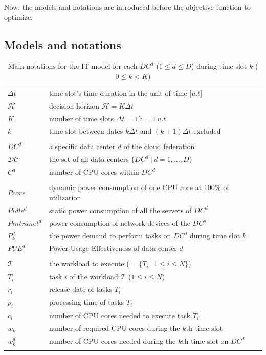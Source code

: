 Now, the models and notations are introduced before the objective function to optimize.

\subsection{Models and notations}
\label{sec:modelsnotations_ccgrid}

\begin{table}[!t]
\caption{Main notations for the IT model for each $DC^d$ ($1\leq d\leq D$) during time slot $k$ ($0\leq k< K$)\label{table:variablesIT}}
\begin{center}
\begin{tabular}{l p{6cm}}


$\Delta t$ & time slot's time duration in the unit of time [$u.t$] \\
$\mathcal{H}$ & decision horizon $\mathcal{H} = K\Delta t$ \\
$K$ & number of time slots $\Delta t = 1\,\text{h} = 1\,u.t.$ \\ 
$k$ & time slot between dates $k\Delta t$ and $(k+1)\Delta t$ excluded \\ \\
$DC^d$ & a specific data center $d$ of the cloud federation \\
$\mathcal{DC}$ & the set of all data centers $\{DC^d \ | \ d=1, \ldots, D\}$ \\
$C^d$ & number of CPU cores within $DC^d$ \\
\\
$Pcore$ & dynamic power consumption of one CPU core at 100\% of utilization \\
$Pidle^d$ & static power consumption of all the servers of $DC^d$ \\
$Pintranet^d$ & power consumption of network devices of the $DC^d$  \\
$P_k^d$ & the power demand to perform tasks on $DC^d$ during time slot $k$ \\ 
$PUE^d$ & Power Usage Effectiveness of data center $d$\\ 
\\
$\mathcal{T}$ & the workload to execute ($ = \{ T_i\ |\ 1\leq i\leq N\}$) \\
$T_i$ & task $i$ of the workload $\mathcal{T}$ ($1\leq i\leq N$) \\
$r_i$ & release date of tasks $T_i$\\
$p_i$ & processing time of tasks $T_i$\\
$c_i$ & number of CPU cores needed to execute task $T_i$\\ 
$w_k$ & number of required CPU cores during the $k$th time slot \\
$w_k^d$ & number of CPU cores needed during the $k$th time slot on $DC^d$\\ \\\end{tabular}
\end{center}
\end{table}


